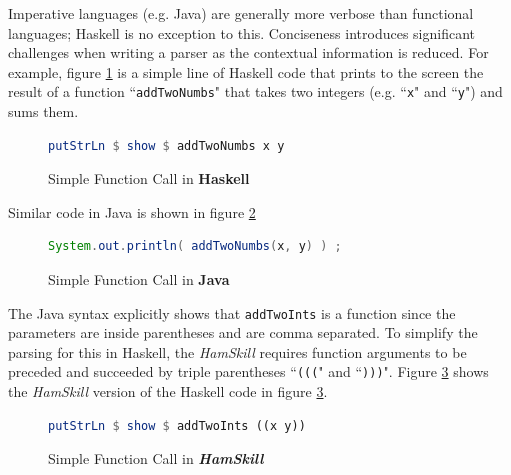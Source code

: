 \documentclass{report}
\begin{document}
Imperative languages (e.g. Java) are generally more verbose than functional languages; Haskell is no exception to this.  Conciseness introduces significant challenges when writing a parser as the contextual information is reduced.  For example, figure \ref{fig:addTwoNumbersHaskell} is a simple line of Haskell code that prints to the screen the result of a function ``{\tt addTwoNumbs}" that takes two integers (e.g. ``{\tt x}" and ``{\tt y}") and sums them. 

\begin{figure}[H]
\begin{mdframed}
\begin{lstlisting}[language=Haskell]
putStrLn $ show $ addTwoNumbs x y
\end{lstlisting}
\end{mdframed}
\caption{Simple Function Call in \textbf{Haskell}}\label{fig:addTwoNumbersHaskell}
\end{figure}

Similar code in Java is shown in figure \ref{fig:addTwoNumbersJava}

\begin{figure}[H]
\begin{mdframed}
\begin{lstlisting}[language=Java]
System.out.println( addTwoNumbs(x, y) ) ;
\end{lstlisting}
\end{mdframed}
\caption{Simple Function Call in \textbf{Java}}\label{fig:addTwoNumbersJava}
\end{figure}

The Java syntax explicitly shows that {\tt addTwoInts} is a function since the parameters are inside parentheses and are comma separated.  To simplify the parsing for this in Haskell, the \emph{HamSkill} requires function arguments to be preceded and succeeded by triple parentheses ``\texttt{(((}" and ``\texttt{)))}".  Figure \ref{fig:addTwoNumbersHamSkill} shows the \emph{HamSkill} version of the Haskell code in figure \ref{fig:addTwoNumbersHamSkill}.

\begin{figure}[H]
\begin{mdframed}
\begin{lstlisting}[language=Haskell]
putStrLn $ show $ addTwoInts ((x y))
\end{lstlisting}
\end{mdframed}
\caption{Simple Function Call in \textbf{\emph{HamSkill}}}\label{fig:addTwoNumbersHamSkill}
\end{figure}
\end{document}
